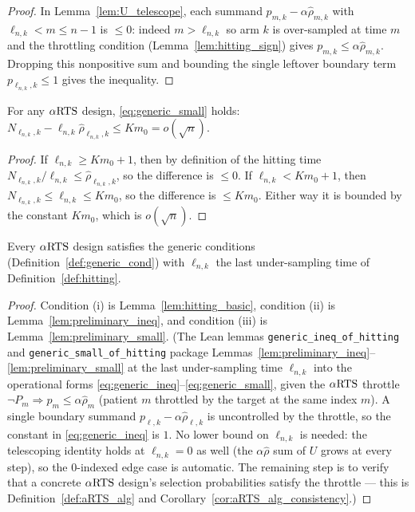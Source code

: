 \begin{proof}\leanok
{}
In Lemma~\ref{lem:U_telescope}, each summand $p_{m,k} - \alpha\hat{\rho}_{m,k}$
with $\ell_{n,k} < m \le n-1$ is $\le 0$: indeed $m > \ell_{n,k}$ so arm $k$
is over-sampled at time $m$ and the throttling condition
(Lemma~\ref{lem:hitting_sign}) gives $p_{m,k} \le \alpha\hat{\rho}_{m,k}$.
Dropping this nonpositive sum and bounding the single leftover boundary term
$p_{\ell_{n,k},k} \le 1$ gives the inequality.
\end{proof}

\begin{lemma}\label{lem:preliminary_small}
\leanok
{}
For any $\alpha\text{RTS}$ design, \eqref{eq:generic_small} holds:
$N_{\ell_{n,k},k} - \ell_{n,k}\hat{\rho}_{\ell_{n,k},k} \le Km_0 = o(\sqrt n)$.
\end{lemma}

\begin{proof}
If $\ell_{n,k} \ge Km_0+1$, then by definition of the hitting time
$N_{\ell_{n,k},k}/\ell_{n,k} \le \hat{\rho}_{\ell_{n,k},k}$, so the difference is
$\le 0$. If $\ell_{n,k} < Km_0+1$, then $N_{\ell_{n,k},k} \le \ell_{n,k} \le Km_0$,
so the difference is $\le Km_0$. Either way it is bounded by the constant $Km_0$,
which is $o(\sqrt n)$.
\leanok
\end{proof}

\begin{proposition}\label{prop:aRTS_generic}
Every $\alpha\text{RTS}$ design satisfies the generic conditions
(Definition~\ref{def:generic_cond}) with $\ell_{n,k}$ the last under-sampling
time of Definition~\ref{def:hitting}.
\end{proposition}

\begin{proof}
Condition (i) is Lemma~\ref{lem:hitting_basic}, condition (ii) is
Lemma~\ref{lem:preliminary_ineq}, and condition (iii) is
Lemma~\ref{lem:preliminary_small}. (The Lean lemmas
\texttt{generic\_ineq\_of\_hitting} and \texttt{generic\_small\_of\_hitting} package
Lemmas~\ref{lem:preliminary_ineq}--\ref{lem:preliminary_small} at the last under-sampling time
$\ell_{n,k}$ into the operational forms \eqref{eq:generic_ineq}--\eqref{eq:generic_small},
given the $\alpha\text{RTS}$ throttle $\neg P_m \Rightarrow p_{m}\le\alpha\hat\rho_m$ (patient $m$ throttled
by the target at the same index $m$). A single boundary summand $p_{\ell,k}-\alpha\hat\rho_{\ell,k}$
is uncontrolled by the throttle, so the constant in \eqref{eq:generic_ineq} is $1$. No lower bound
on $\ell_{n,k}$ is needed: the telescoping identity holds at $\ell_{n,k}=0$ as well (the
$\alpha\hat\rho$ sum of $U$ grows at every step), so the $0$-indexed edge case is automatic. The
remaining step is to verify that a concrete $\alpha\text{RTS}$ design's selection probabilities satisfy the
throttle — this is Definition~\ref{def:aRTS_alg} and Corollary~\ref{cor:aRTS_alg_consistency}.)
\end{proof}

